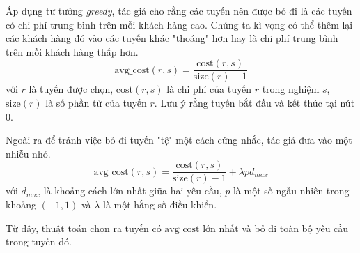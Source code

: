 Áp dụng tư tưởng \textit{greedy}, tác giả cho rằng các tuyến nên được bỏ đi là các tuyến có chi phí trung bình trên mỗi khách hàng cao. Chúng ta kì vọng có thể thêm lại các khách hàng đó vào các tuyến khác "thoáng" hơn hay là chi phí trung bình trên mỗi khách hàng thấp hơn. 
\begin{equation}
  \label{eq:destroy_route}
  \text{avg\_cost}(r, s) = \frac{\text{cost}(r, s)}{\text{size}(r)-1}
\end{equation}
với $r$ là tuyến được chọn, $\text{cost}(r,s)$ là chi phí của tuyến $r$ trong nghiệm $s$, $\text{size}(r)$ là số phần tử của tuyến $r$. Lưu ý rằng tuyến bắt đầu và kết thúc tại nút $0$.

Ngoài ra để tránh việc bỏ đi tuyến "tệ" một cách cứng nhắc, tác giả đưa vào một nhiễu nhỏ.\begin{equation}
  \label{eq:destroy_route}
  \text{avg\_cost}(r, s) = \frac{\text{cost}(r, s)}{\text{size}(r)-1} + \lambda p d_{max}
\end{equation}
với $d_{max}$ là khoảng cách lớn nhất giữa hai yêu cầu, $p$ là một số ngẫu nhiên trong khoảng $(-1,1)$ và $\lambda$ là một hằng số điều khiển.

Từ đây, thuật toán chọn ra tuyến có $\text{avg\_cost}$ lớn nhất và bỏ đi toàn bộ yêu cầu trong tuyến đó.